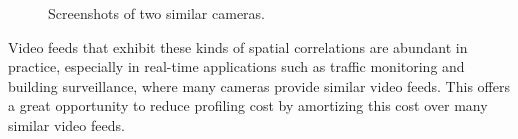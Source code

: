 \begin{figure}
    \centering
    \hspace{-0.5cm}
    \caption{Screenshots of two similar cameras.}
    \label{fig:similar cameras}
\end{figure}



Video feeds that exhibit these kinds of spatial correlations are abundant in practice, especially in real-time applications such as traffic monitoring and building surveillance, where many cameras provide similar video feeds. 
This offers a great opportunity to reduce profiling cost by amortizing this cost over many similar video feeds.


